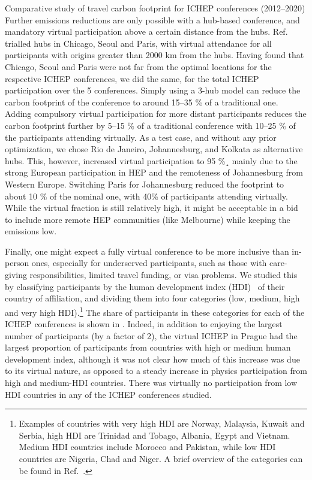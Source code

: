 \documentclass[../SustainableHEP.tex]{subfiles}
\begin{document}
\begin{casestudy}{Comparative study of travel carbon footprint for ICHEP conferences (2012--2020)}
Further emissions reductions are only possible with a hub-based conference, and mandatory virtual participation above a certain distance from the hubs. Ref.~\cite{RefAGU} trialled hubs in Chicago, Seoul and Paris, with virtual attendance for all participants with origins greater than 2000 km from the hubs.  Having found that Chicago, Seoul and Paris were not far from the optimal locations for the respective ICHEP conferences, we did the same, for the total ICHEP participation over the 5 conferences.  Simply using a 3-hub model can reduce the carbon footprint of the conference to around 15--35 \% of a traditional one.  Adding compulsory virtual participation for more distant participants reduces the carbon footprint further by 5--15 \% of a traditional conference with 10--25 \% of the participants attending virtually.  As a test case, and without any prior optimization, we chose Rio de Janeiro, Johannesburg, and Kolkata as alternative hubs. This, however, increased virtual participation to 95 \%¸ mainly due to the strong European participation in HEP and the remoteness of Johannesburg from Western Europe. Switching Paris for Johannesburg reduced the footprint to about 10 \% of the nominal one, with 40\% of participants attending virtually. While the virtual fraction is still relatively high, it might be acceptable in a bid to include more remote HEP communities (like Melbourne) while keeping the emissions low.

Finally, one might expect a fully virtual conference to be more inclusive than in-person ones, especially for underserved participants, such as those with care-giving responsibilities, limited travel funding, or visa problems.  We studied this by classifying participants by the human development index (HDI)~\cite{hdiref} of their country of affiliation, and dividing them into four categories (low, medium, high and very high HDI).\footnote{Examples of countries with very high HDI are Norway,  Malaysia, Kuwait and Serbia, high HDI are \eg Trinidad and Tobago, Albania, Egypt and Vietnam. Medium HDI countries include Morocco and Pakistan, while low HDI countries are \eg Nigeria, Chad and Niger. A brief overview of the categories can be found in Ref.~\cite{hdiref}.}  The share of participants in these categories for each of the ICHEP conferences is shown in . Indeed, in addition to enjoying the largest number of participants (by a factor of 2), the virtual ICHEP in Prague had the largest proportion of participants from countries with high or medium human development index, although it was not clear how much of this increase was due to its virtual nature, as opposed to a steady increase in physics participation from high and medium-HDI countries.  There was virtually no participation from low HDI countries in any of the ICHEP conferences studied.


\end{casestudy}
\end{document}
